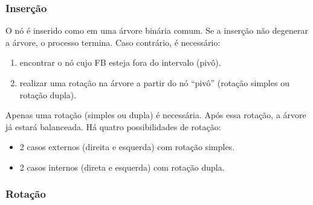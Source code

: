 \subsubsection{Inserção}

O nó é inserido como em uma árvore binária comum.
Se a inserção não degenerar a árvore, o processo termina.
Caso contrário, é necessário:
\begin{enumerate}
\item encontrar o nó cujo FB esteja fora do intervalo (pivô).
\item realizar uma rotação na árvore a partir do nó ``pivô''
(rotação simples ou rotação dupla).
\end{enumerate}
Apenas uma rotação (simples ou dupla) é necessária.
Após essa rotação, a árvore já estará balanceada.
Há quatro possibilidades de rotação:
\begin{itemize}
\item 2 casos externos (direita e esquerda) com rotação simples.
\item 2 casos internos (direta e esquerda) com rotação dupla.
\end{itemize}

\subsubsection{Rotação}


